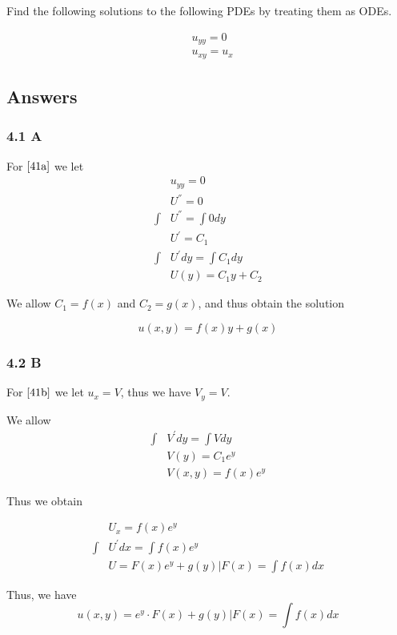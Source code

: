 \documentclass{article}
\begin{document}
Find the following solutions to the following PDEs by treating them as ODEs.

\begin{align}
&u_{yy}=0 \label{41a} \\
&u_{xy}=u_x \label{41b}
\end{align}

\subsection*{Answers}

\subsubsection*{4.1 A}

For $\eqref{41a}$ we let
\begin{align*}
&u_{yy}=0 \\
&U^{''} = 0\\
\int &U^{''} = \int 0 dy \\
&U^{'} = C_1 \\
\int &U^{'} dy = \int C_1 dy \\
&U(y) = C_1y + C_2
\end{align*}

We allow $C_1 = f(x)$ and $C_2 = g(x)$, and thus obtain the solution

$$ u(x,y) = f(x)y + g(x) $$

\subsubsection*{4.2 B}

For $\eqref{41b}$ we let $u_x = V$, thus we have $V_y = V$.

We allow
\begin{align*}
\int &V^{'} dy = \int V dy \\
&V\left(y\right) = C_1 e^{y} \\
&V\left(x,y\right) = f(x) e^{y}
\end{align*}

Thus we obtain

\begin{align*}
&U_x = f(x) e^{y} \\
\int &U^{'} dx = \int f(x) e^{y} \\
&U = F\left(x\right) e^{y} + g\left(y\right)\Bigr| F\left(x\right) = \int f\left(x\right) dx
\end{align*}

Thus, we have
$$u(x,y) = e^{y} \cdot F(x) + g(y)\Bigr| F\left(x\right) = \int f\left(x\right) dx$$
\end{document}
